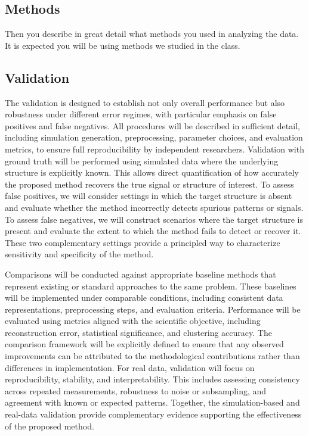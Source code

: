 \documentclass[12pt,portrait]{article}
\begin{document}
\subsection{Methods}  Then you describe in great detail what methods you used in analyzing the data.  It is expected you will be using methods we studied in the class. \\

\subsection{Validation}

The validation is designed to establish not only overall performance but also robustness under different error regimes, with particular emphasis on false positives and false negatives. All procedures will be described in sufficient detail, including simulation generation, preprocessing, parameter choices, and evaluation metrics, to ensure full reproducibility by independent researchers. Validation with ground truth will be performed using simulated data where the underlying structure is explicitly known. This allows direct quantification of how accurately the proposed method recovers the true signal or structure of interest. To assess false positives, we will consider settings in which the target structure is absent and evaluate whether the method incorrectly detects spurious patterns or signals. To assess false negatives, we will construct scenarios where the target structure is present and evaluate the extent to which the method fails to detect or recover it. These two complementary settings provide a principled way to characterize sensitivity and specificity of the method. 


Comparisons will be conducted against appropriate baseline methods that represent existing or standard approaches to the same problem. These baselines will be implemented under comparable conditions, including consistent data representations, preprocessing steps, and evaluation criteria. Performance will be evaluated using metrics aligned with the scientific objective, including reconstruction error, statistical significance, and clustering accuracy. The comparison framework will be explicitly defined to ensure that any observed improvements can be attributed to the methodological contributions rather than differences in implementation. For real data, validation will focus on reproducibility, stability, and interpretability. This includes assessing consistency across repeated measurements, robustness to noise or subsampling, and agreement with known or expected patterns. Together, the simulation-based and real-data validation provide complementary evidence supporting the effectiveness of the proposed method.
\end{document}
